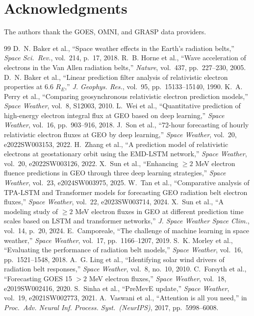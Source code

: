 \documentclass[conference]{IEEEtran}
\begin{document}
\section*{Acknowledgments}
The authors thank the GOES, OMNI, and GRASP data providers.

\begin{thebibliography}{99}
D.~N. Baker et al., ``Space weather effects in the Earth's radiation belts,''
\emph{Space Sci.\ Rev.}, vol.~214, p.~17, 2018.
R.~B. Horne et al., ``Wave acceleration of electrons in the Van Allen
radiation belts,'' \emph{Nature}, vol.~437, pp.~227--230, 2005.
D.~N. Baker et al., ``Linear prediction filter analysis of relativistic
electron properties at 6.6 \(R_E\),'' \emph{J. Geophys. Res.}, vol.~95,
pp.~15133--15140, 1990.
K.~A. Perry et al., ``Comparing geosynchronous relativistic electron
prediction models,'' \emph{Space Weather}, vol.~8, S12003, 2010.
L.~Wei et al., ``Quantitative prediction of high-energy electron integral flux
at GEO based on deep learning,'' \emph{Space Weather}, vol.~16,
pp.~903--916, 2018.
J.~Son et al., ``72-hour forecasting of hourly relativistic electron fluxes at
GEO by deep learning,'' \emph{Space Weather}, vol.~20, e2022SW003153, 2022.
H.~Zhang et al., ``A prediction model of relativistic electrons at
geostationary orbit using the EMD-LSTM network,''
\emph{Space Weather}, vol.~20, e2022SW003126, 2022.
X.~Sun et al., ``Enhancing \(\ge2\) MeV electron fluence predictions in GEO
through three deep learning strategies,'' \emph{Space Weather}, vol.~23,
e2024SW003975, 2025.
W.~Tan et al., ``Comparative analysis of TPA-LSTM and Transformer models
for forecasting GEO radiation belt electron fluxes,'' \emph{Space Weather}, vol.~22, e2023SW003714, 2024.
X.~Sun et al., ``A modeling study of \(\ge2\) MeV electron fluxes in GEO at
different prediction time scales based on LSTM and transformer networks,'' \emph{J. Space Weather Space Clim.},
vol.~14, p.~20, 2024.
E.~Camporeale, ``The challenge of machine learning in space weather,''
\emph{Space Weather}, vol.~17, pp.~1166--1207, 2019.
S.~K. Morley et al., ``Evaluating the performance of radiation belt models,''
\emph{Space Weather}, vol.~16, pp.~1521--1548, 2018.
A.~G. Ling et al., ``Identifying solar wind drivers of radiation belt
responses,'' \emph{Space Weather}, vol.~8, no.~10, 2010.
C.~Forsyth et al., ``Forecasting GOES 15 \(>2\) MeV electron fluxes,''
\emph{Space Weather}, vol.~18, e2019SW002416, 2020.
S.~Sinha et al., ``PreMevE update,'' \emph{Space Weather}, vol.~19,
e2021SW002773, 2021.
A.~Vaswani et al., ``Attention is all you need,'' in \emph{Proc.\ Adv. Neural Inf. Process. Syst.\ (NeurIPS)}, 2017,
pp.~5998--6008.
\end{thebibliography}
\end{document}
